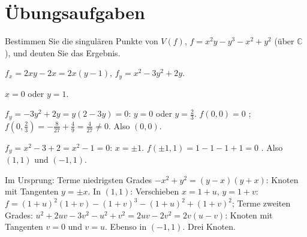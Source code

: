 \section{Übungsaufgaben}

\begin{aufgabe}
Bestimmen Sie die singulären Punkte von $V(f)$, $f = x^{2}y - y^{3} - x^{2} + y^{2}$ (über $\mathbb C$), und deuten Sie das Ergebnis.

\loesung
{}
$f_x = 2xy - 2x = 2x(y - 1)$, $f_y = x^{2} - 3y^{2} + 2y$.

$x = 0$ oder $y = 1$.

$f_y = -3y^{2} + 2y = y(2 - 3y) = 0$: $y = 0$ oder $y = \tfrac23$. $f(0, 0) = 0$ \checkmark; $f(0, \tfrac23) = -\tfrac{8}{27} + \tfrac49 = \tfrac{4}{27}\ne0$. Also $(0, 0)$.

$f_y = x^{2} - 3 + 2 = x^{2} - 1 = 0$: $x = \pm1$. $f(\pm1, 1) = 1 - 1 - 1 + 1 = 0$ \checkmark. Also $(1, 1)$ und $(-1, 1)$.

Im Ursprung: Terme niedrigsten Grades $-x^{2} + y^{2} = (y - x)(y + x)$: Knoten mit Tangenten $y = \pm x$. In $(1, 1)$: Verschieben $x = 1 + u$, $y = 1 + v$: $f = (1 + u)^{2}(1 + v) - (1 + v)^{3} - (1 + u)^{2} + (1 + v)^{2}$; Terme zweiten Grades: $u^{2} + 2uv - 3v^{2} - u^{2} + v^{2} = 2uv - 2v^{2} = 2v(u - v)$: Knoten mit Tangenten $v = 0$ und $v = u$. Ebenso in $(-1, 1)$. Drei Knoten.

\begin{center}
\begin{minipage}{0.88\textwidth}
\end{minipage}
\end{center}
\end{aufgabe}

